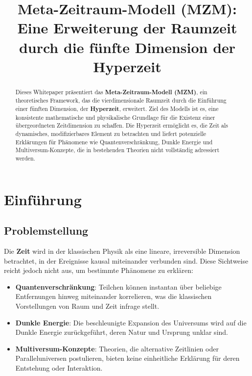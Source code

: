 \documentclass[11pt,a4paper]{article}
\title{\textbf{Meta-Zeitraum-Modell (MZM):\\Eine Erweiterung der Raumzeit durch die fünfte Dimension der Hyperzeit}}
\author{}
\date{}
\begin{document}
\maketitle

\begin{abstract}
Dieses Whitepaper präsentiert das \textbf{Meta-Zeitraum-Modell (MZM)}, ein theoretisches Framework, das die vierdimensionale Raumzeit durch die Einführung einer fünften Dimension, der \textbf{Hyperzeit}, erweitert. Ziel des Modells ist es, eine konsistente mathematische und physikalische Grundlage für die Existenz einer übergeordneten Zeitdimension zu schaffen. Die Hyperzeit ermöglicht es, die Zeit als dynamisches, modifizierbares Element zu betrachten und liefert potenzielle Erklärungen für Phänomene wie Quantenverschränkung, Dunkle Energie und Multiversum-Konzepte, die in bestehenden Theorien nicht vollständig adressiert werden.
\end{abstract}

\tableofcontents
\newpage

\section{Einführung}

\subsection{Problemstellung}

Die \textbf{Zeit} wird in der klassischen Physik als eine lineare, irreversible Dimension betrachtet, in der Ereignisse kausal miteinander verbunden sind. Diese Sichtweise reicht jedoch nicht aus, um bestimmte Phänomene zu erklären:

\begin{itemize}
    \item \textbf{Quantenverschränkung}: Teilchen können instantan über beliebige Entfernungen hinweg miteinander korrelieren, was die klassischen Vorstellungen von Raum und Zeit infrage stellt.
    \item \textbf{Dunkle Energie}: Die beschleunigte Expansion des Universums wird auf die Dunkle Energie zurückgeführt, deren Natur und Ursprung unklar sind.
    \item \textbf{Multiversum-Konzepte}: Theorien, die alternative Zeitlinien oder Paralleluniversen postulieren, bieten keine einheitliche Erklärung für deren Entstehung oder Interaktion.
\end{itemize}
\end{document}
